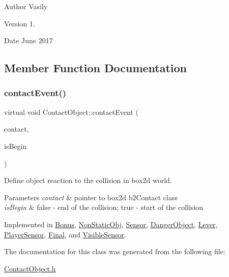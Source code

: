 \begin{DoxyAuthor}{Author}
Vasily 
\end{DoxyAuthor}
\begin{DoxyVersion}{Version}
1. 
\end{DoxyVersion}
\begin{DoxyDate}{Date}
June 2017 
\end{DoxyDate}


\subsection{Member Function Documentation}
\mbox{\label{class_contact_object_a53d2dfc1d9c2821e9c62e80ce62a6435}} 
\subsubsection{\texorpdfstring{contact\+Event()}{contactEvent()}}
{\footnotesize\ttfamily virtual void Contact\+Object\+::contact\+Event (\begin{DoxyParamCaption}\item[{b2\+Contact $\ast$}]{contact,  }\item[{bool}]{is\+Begin }\end{DoxyParamCaption})\hspace{0.3cm}{\ttfamily [pure virtual]}}



Define object reaction to the collision in box2d world. 


\begin{DoxyParams}{Parameters}
{\em contact} & pointer to box2d b2\+Contact class \\
\hline
{\em is\+Begin} & \textquotesingle{}false\textquotesingle{} -\/ end of the collision; \textquotesingle{}true\textquotesingle{} -\/ start of the collision \\
\hline
\end{DoxyParams}


Implemented in \hyperlink{class_bonus_abc52e8c896f8ec6631ac5dcd7e4daf12}{Bonus}, \hyperlink{class_non_static_obj_af2a40f79983a88c185c0bf9977e2d50d}{Non\+Static\+Obj}, \hyperlink{class_sensor_a3445be09d7e8905b1d8e46f2e0306542}{Sensor}, \hyperlink{class_danger_object_a542702fda89ff9549866d9b93a603fbb}{Danger\+Object}, \hyperlink{class_lever_a08d617d4aad99c811df6013648843d8b}{Lever}, \hyperlink{class_player_sensor_a6977b8699ebf0d3d2d2b177665060f21}{Player\+Sensor}, \hyperlink{class_final_abb9a6e24a09308aed3dfd510074b1201}{Final}, and \hyperlink{class_visible_sensor_a33adba65182352abad1f71646b9ecfa5}{Visible\+Sensor}.



The documentation for this class was generated from the following file\+:\begin{DoxyCompactItemize}
\item 
\hyperlink{_contact_object_8h}{Contact\+Object.\+h}\end{DoxyCompactItemize}
